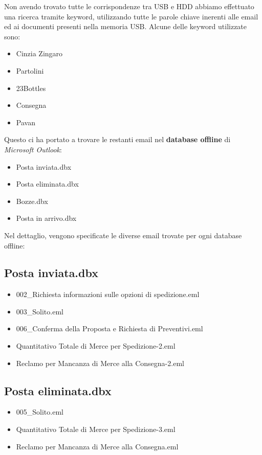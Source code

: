 Non avendo trovato tutte le corrispondenze tra USB e HDD abbiamo effettuato una ricerca tramite keyword, utilizzando tutte le parole chiave inerenti alle email ed ai documenti presenti nella memoria USB. Alcune delle keyword utilizzate sono:
\begin{itemize}
    \item Cinzia Zingaro
    \item Partolini
    \item 23Bottles
    \item Consegna
    \item Pavan
\end{itemize}
Questo ci ha portato a trovare le restanti email nel \textbf{database offline} di \textit{Microsoft Outlook}:
\begin{itemize}
    \item Posta inviata.dbx
    \item Posta eliminata.dbx
    \item Bozze.dbx
    \item Posta in arrivo.dbx
\end{itemize}

\pagebreak

Nel dettaglio, vengono specificate le diverse email trovate per ogni database offline:
\subsection{Posta inviata.dbx}
\begin{itemize}
    \item 002\_Richiesta informazioni sulle opzioni di spedizione.eml
    \item 003\_Solito.eml
    \item 006\_Conferma della Proposta e Richiesta di Preventivi.eml
    \item Quantitativo Totale di Merce per Spedizione-2.eml
    \item Reclamo per Mancanza di Merce alla Consegna-2.eml
\end{itemize}

\subsection{Posta eliminata.dbx}
\begin{itemize}
    \item 005\_Solito.eml
    \item Quantitativo Totale di Merce per Spedizione-3.eml
    \item Reclamo per Mancanza di Merce alla Consegna.eml
\end{itemize}

